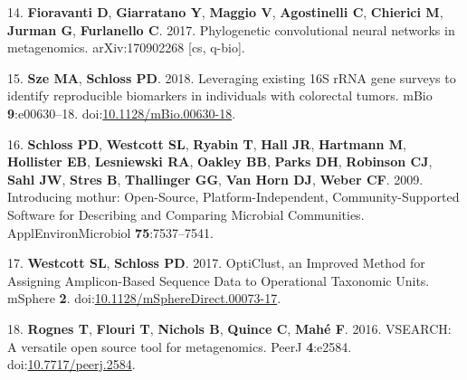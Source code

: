 \documentclass[11pt,]{article}
\begin{document}
\hypertarget{ref-fioravanti_phylogenetic_2017}{}
14. \textbf{Fioravanti D}, \textbf{Giarratano Y}, \textbf{Maggio V},
\textbf{Agostinelli C}, \textbf{Chierici M}, \textbf{Jurman G},
\textbf{Furlanello C}. 2017. Phylogenetic convolutional neural networks
in metagenomics. arXiv:170902268 {[}cs, q-bio{]}.

\hypertarget{ref-sze_leveraging_2018}{}
15. \textbf{Sze MA}, \textbf{Schloss PD}. 2018. Leveraging existing 16S
rRNA gene surveys to identify reproducible biomarkers in individuals
with colorectal tumors. mBio \textbf{9}:e00630--18.
doi:\href{https://doi.org/10.1128/mBio.00630-18}{10.1128/mBio.00630-18}.

\hypertarget{ref-schloss_introducing_2009}{}
16. \textbf{Schloss PD}, \textbf{Westcott SL}, \textbf{Ryabin T},
\textbf{Hall JR}, \textbf{Hartmann M}, \textbf{Hollister EB},
\textbf{Lesniewski RA}, \textbf{Oakley BB}, \textbf{Parks DH},
\textbf{Robinson CJ}, \textbf{Sahl JW}, \textbf{Stres B},
\textbf{Thallinger GG}, \textbf{Van Horn DJ}, \textbf{Weber CF}. 2009.
Introducing mothur: Open-Source, Platform-Independent,
Community-Supported Software for Describing and Comparing Microbial
Communities. ApplEnvironMicrobiol \textbf{75}:7537--7541.

\hypertarget{ref-westcott_opticlust_2017}{}
17. \textbf{Westcott SL}, \textbf{Schloss PD}. 2017. OptiClust, an
Improved Method for Assigning Amplicon-Based Sequence Data to
Operational Taxonomic Units. mSphere \textbf{2}.
doi:\href{https://doi.org/10.1128/mSphereDirect.00073-17}{10.1128/mSphereDirect.00073-17}.

\hypertarget{ref-rognes_vsearch_2016}{}
18. \textbf{Rognes T}, \textbf{Flouri T}, \textbf{Nichols B},
\textbf{Quince C}, \textbf{Mahé F}. 2016. VSEARCH: A versatile open
source tool for metagenomics. PeerJ \textbf{4}:e2584.
doi:\href{https://doi.org/10.7717/peerj.2584}{10.7717/peerj.2584}.
\end{document}
